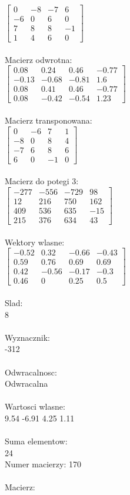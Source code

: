 \documentclass[a4paper,12pt]{article}
\begin{document}
$\begin{bmatrix} 0&-8&-7&6\\-6&0&6&0\\7&8&8&-1\\1&4&6&0 \end{bmatrix}$
\\
\\
Macierz odwrotna:\\

$\begin{bmatrix} 0.08&0.24&0.46&-0.77\\-0.13&-0.68&-0.81&1.6\\0.08&0.41&0.46&-0.77\\0.08&-0.42&-0.54&1.23 \end{bmatrix}$
\\
\\
Macierz transponowana:\\

$\begin{bmatrix} 0&-6&7&1\\-8&0&8&4\\-7&6&8&6\\6&0&-1&0 \end{bmatrix}$
\\
\\
Macierz do potegi 3:\\

$\begin{bmatrix} -277&-556&-729&98\\12&216&750&162\\409&536&635&-15\\215&376&634&43 \end{bmatrix}$
\\
\\
Wektory wlasne:\\

$\begin{bmatrix} -0.52&0.32&-0.66&-0.43\\0.59&0.76&0.69&0.69\\0.42&-0.56&-0.17&-0.3\\0.46&0&0.25&0.5 \end{bmatrix}$
\\
\\
Slad:\\
8
\\
\\
Wyznacznik:\\
-312
\\
\\
Odwracalnosc:\\
Odwracalna
\\
\\
Wartosci wlasne:\\
9.54 -6.91 4.25 1.11
\\
\\
Suma elementow:\\
24
\\
\newpage
Numer macierzy:
170
\\
\\
Macierz:\\
\end{document}
